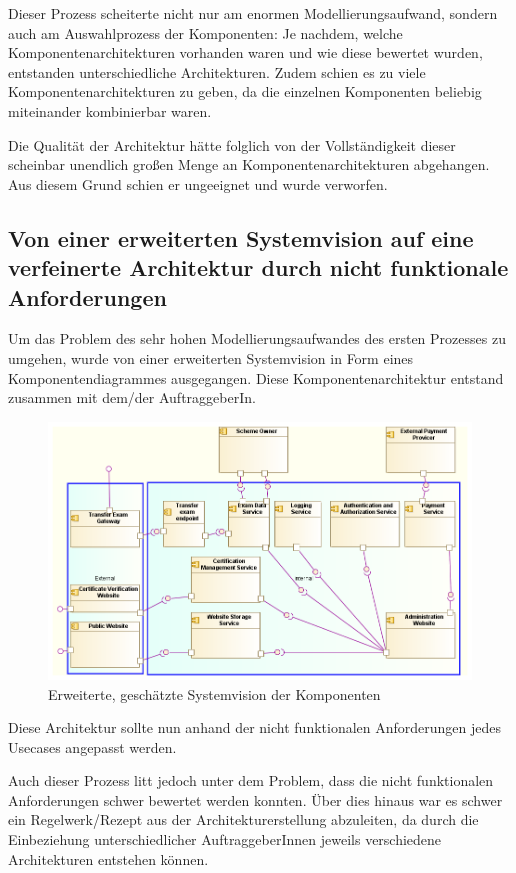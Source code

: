 Dieser Prozess scheiterte nicht nur am enormen Modellierungsaufwand, sondern auch am Auswahlprozess der Komponenten: Je nachdem, welche Komponentenarchitekturen vorhanden waren und wie diese bewertet wurden, entstanden unterschiedliche Architekturen. Zudem schien es zu viele Komponentenarchitekturen zu geben, da die einzelnen Komponenten beliebig miteinander kombinierbar waren.

Die Qualität der Architektur hätte folglich von der Vollständigkeit dieser scheinbar unendlich großen Menge an Komponentenarchitekturen abgehangen. Aus diesem Grund schien er ungeeignet und wurde verworfen.

\subsection{Von einer erweiterten Systemvision auf eine verfeinerte Architektur durch nicht funktionale Anforderungen}
Um das Problem des sehr hohen Modellierungsaufwandes des ersten Prozesses zu umgehen, wurde von einer erweiterten Systemvision in Form eines Komponentendiagrammes ausgegangen. Diese Komponentenarchitektur entstand zusammen mit dem/der AuftraggeberIn.

\begin{figure}[!htbp]
    \centering
    \includegraphics[scale=0.5]{uml/vision2.png}
    \caption{Erweiterte, geschätzte Systemvision der Komponenten}
\end{figure}

Diese Architektur sollte nun anhand der nicht funktionalen Anforderungen jedes Usecases angepasst werden.

Auch dieser Prozess litt jedoch unter dem Problem, dass die nicht funktionalen Anforderungen schwer bewertet werden konnten. Über dies hinaus war es schwer ein Regelwerk/Rezept aus der Architekturerstellung abzuleiten, da durch die Einbeziehung unterschiedlicher AuftraggeberInnen jeweils verschiedene Architekturen entstehen können.

